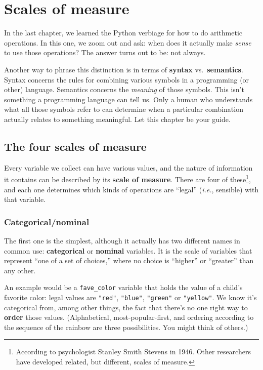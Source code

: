 

\chapter{Scales of measure}

In the last chapter, we learned the Python verbiage for how to do arithmetic
operations. In this one, we zoom out and ask: when does it actually make
\textit{sense} to use those operations? The answer turns out to be: not always.

Another way to phrase this distinction is in terms of \textbf{syntax}
vs.~\textbf{semantics}. Syntax concerns the rules for combining various symbols
in a programming (or other) language. Semantics concerns the \textit{meaning}
of those symbols. This isn't something a programming language can tell us. Only
a human who understands what all those symbols refer to can determine when a
particular combination actually relates to something meaningful. Let this
chapter be your guide.

\section{The four scales of measure}

Every variable we collect can have various values, and the nature of
information it contains can be described by its \textbf{scale of measure}.
There are four of these\footnote{According to psychologist Stanley Smith
Stevens in 1946. Other researchers have developed related, but different,
scales of measure.}, and each one determines which kinds of operations are
``legal'' (\textit{i.e.}, sensible) with that variable.

\subsection{Categorical/nominal}

The first one is the simplest, although it actually has two different names in
common use: \textbf{categorical} or \textbf{nominal} variables. It is the scale
of variables that represent ``one of a set of choices,'' where no choice is
``higher'' or ``greater'' than any other.

An example would be a \texttt{fave\_color} variable that holds the value of a
child's favorite color: legal values are \texttt{"red"}, \texttt{"blue"},
\texttt{"green"} or \texttt{"yellow"}. We know it's categorical from, among
other things, the fact that there's no one right way to \textbf{order} those
values. (Alphabetical, most-popular-first, and ordering according to the
sequence of the rainbow are three possibilities. You might think of others.)

